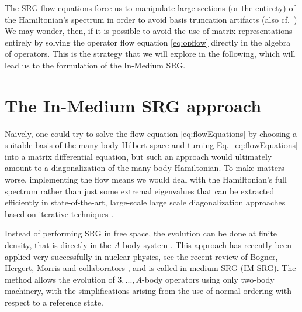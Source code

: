 The SRG flow equations force us to manipulate large sections (or the 
entirety) of the Hamiltonian's spectrum in order to avoid basis 
truncation artifacts (also cf.~\cite{Roth:2014fk,Binder:2014fk})
We may wonder, then, if it is possible to avoid the use of matrix 
representations entirely by solving the operator flow equation 
\eqref{eq:opflow} directly in the algebra of operators. This is the 
strategy that we will explore in the following, which will 
lead us to the formulation of the In-Medium SRG. 

\section{\label{sec:imsrg}The In-Medium SRG approach}
Naively, one could try to solve the flow equation \eqref{eq:flowEquations} by
choosing a suitable basis of the many-body Hilbert space and turning
Eq.~\eqref{eq:flowEquations} into a matrix differential equation, but such an
approach would ultimately amount to a diagonalization of the many-body
Hamiltonian. To make matters worse, implementing the flow means we
would deal with the Hamiltonian's full spectrum rather than just some
extremal eigenvalues that can be extracted efficiently in
state-of-the-art, large-scale large scale diagonalization approaches based on iterative techniques
\cite{Golub:2013le}.



Instead of performing SRG in free space, the evolution can be done at
finite density, that is directly in the $A$-body system
\cite{Kehrein:2006kx}. This approach has recently been applied very
successfully in nuclear physics, see the recent review of Bogner, Hergert, Morris and collaborators 
\cite{Hergert:2016jk,Hergert:2016ng,Morris:2016xp},
and is called in-medium SRG (IM-SRG). The method allows the evolution
of $3,...,A$-body operators using only two-body machinery, with the
simplifications arising from the use of normal-ordering with respect
to a reference state.

